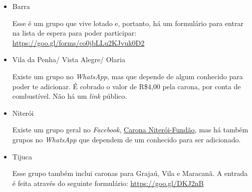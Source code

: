     \begin{itemize}
        \item Barra
            
            Esse é um grupo que vive lotado e, portanto, há um formulário para entrar na lista de espera para poder participar: \href{https://goo.gl/forms/co0jbLLu2KJvuk0D2}{https://goo.gl/forms/co0jbLLu2KJvuk0D2}
            
        \item Vila da Penha/ Vista Alegre/ Olaria
        
            Existe um grupo no \textit{WhatsApp}, mas que depende de algum conhecido para poder te adicionar. É cobrado o valor de R\$4,00 pela carona, por conta de combustível. Não há um \textit{link} público.
        
        \item Niterói
        
            Existe um grupo geral no \textit{Facebook}, \href{https://www.facebook.com/groups/134126660012592/}{Carona Niterói-Fundão}, mas há também grupos no \textit{WhatsApp} que dependem de um conhecido para ser adicionado.
        
        \item Tijuca
        
            Esse grupo também inclui caronas para Grajaú, Vila e Maracanã. A entrada é feita através do seguinte formulário: \href{https://goo.gl/DKJ2nB}{https://goo.gl/DKJ2nB}
        
    \end{itemize}
    
    
    
